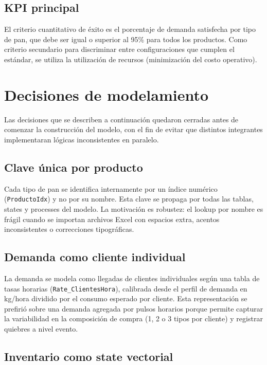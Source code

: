 \documentclass[12pt]{article}
\begin{document}
\subsection{KPI principal}

El criterio cuantitativo de éxito es el porcentaje de demanda satisfecha por tipo de pan, que debe ser igual o superior al 95\% para todos los productos. Como criterio secundario para discriminar entre configuraciones que cumplen el estándar, se utiliza la utilización de recursos (minimización del costo operativo).

\newpage
\section{Decisiones de modelamiento}

Las decisiones que se describen a continuación quedaron cerradas antes de comenzar la construcción del modelo, con el fin de evitar que distintos integrantes implementaran lógicas inconsistentes en paralelo.

\subsection{Clave única por producto}

Cada tipo de pan se identifica internamente por un índice numérico (\texttt{ProductoIdx}) y no por su nombre. Esta clave se propaga por todas las tablas, states y processes del modelo. La motivación es robustez: el lookup por nombre es frágil cuando se importan archivos Excel con espacios extra, acentos inconsistentes o correcciones tipográficas.

\subsection{Demanda como cliente individual}

La demanda se modela como llegadas de clientes individuales según una tabla de tasas horarias (\texttt{Rate\_ClientesHora}), calibrada desde el perfil de demanda en kg/hora dividido por el consumo esperado por cliente. Esta representación se prefirió sobre una demanda agregada por pulsos horarios porque permite capturar la variabilidad en la composición de compra (1, 2 o 3 tipos por cliente) y registrar quiebres a nivel evento.

\subsection{Inventario como state vectorial}
\end{document}
